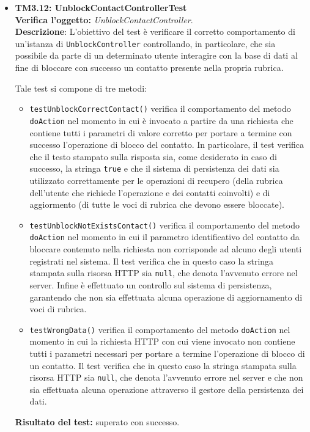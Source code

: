 \begin{itemize}
\item \textbf{TM3.12: UnblockContactControllerTest}\\
\textbf{Verifica l'oggetto:} \textit{UnblockContactController}.\\
\textbf{Descrizione}: L'obiettivo del test è verificare il corretto comportamento di un'istanza di \texttt{UnblockController} controllando, in particolare, che sia possibile da parte di un determinato utente interagire con la base di dati al fine di bloccare con successo un contatto presente nella propria rubrica.

Tale test si compone di tre metodi:
\begin{itemize}
\item \texttt{testUnblockCorrectContact()} verifica il comportamento del metodo \texttt{doAction} nel momento in cui è invocato a partire da una richiesta che contiene tutti i parametri di valore corretto per portare a termine con successo l'operazione di blocco del contatto. In particolare, il test verifica che il testo stampato sulla risposta sia, come desiderato in caso di successo, la stringa \texttt{true} e che il sistema di persistenza dei dati sia utilizzato correttamente per le operazioni di recupero (della rubrica dell'utente che richiede l'operazione e dei contatti coinvolti) e di aggiormento (di tutte le voci di rubrica che devono essere bloccate).

\item \texttt{testUnblockNotExistsContact()} verifica il comportamento del metodo \texttt{doAction} nel momento in cui il parametro identificativo del contatto da bloccare contenuto nella richiesta non corrisponde ad alcuno degli utenti registrati nel sistema.
Il test verifica che in questo caso la stringa stampata sulla risorsa HTTP sia \texttt{null}, che denota l'avvenuto errore nel server. Infine è effettuato un controllo sul sistema di persistenza, garantendo che non sia effettuata alcuna operazione di aggiornamento di voci di rubrica.

\item \texttt{testWrongData()} verifica il comportamento del metodo \texttt{doAction} nel momento in cui la richiesta HTTP con cui viene invocato non contiene tutti i parametri necessari per portare a termine l'operazione di blocco di un contatto.
Il test verifica che in questo caso la stringa stampata sulla risorsa HTTP sia \texttt{null}, che denota l'avvenuto errore nel server e che non sia effettuata alcuna operazione attraverso il gestore della persistenza dei dati.

\end{itemize}
\textbf{Risultato del test:} superato con successo.

\end{itemize}


